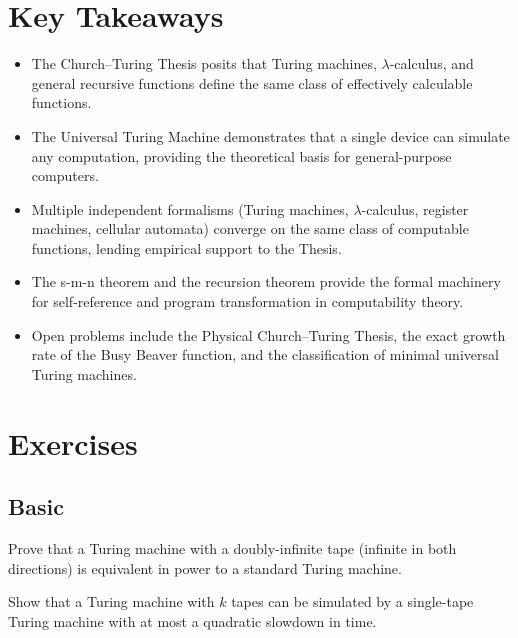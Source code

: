 \section*{Key Takeaways}
\begin{itemize}
\item The Church--Turing Thesis posits that Turing machines, $\lambda$-calculus, and general recursive functions define the same class of effectively calculable functions.
\item The Universal Turing Machine demonstrates that a single device can simulate any computation, providing the theoretical basis for general-purpose computers.
\item Multiple independent formalisms (Turing machines, $\lambda$-calculus, register machines, cellular automata) converge on the same class of computable functions, lending empirical support to the Thesis.
\item The s-m-n theorem and the recursion theorem provide the formal machinery for self-reference and program transformation in computability theory.
\item Open problems include the Physical Church--Turing Thesis, the exact growth rate of the Busy Beaver function, and the classification of minimal universal Turing machines.
\end{itemize}

\section{Exercises}
\label{sec:computation:exercises}

\subsection*{Basic}

\begin{exercise}[Basic]
Prove that a Turing machine with a doubly-infinite tape (infinite in both directions) is equivalent in power to a standard Turing machine.
\end{exercise}

\begin{exercise}[Basic]
Show that a Turing machine with $k$ tapes can be simulated by a single-tape Turing machine with at most a quadratic slowdown in time.
\end{exercise}

